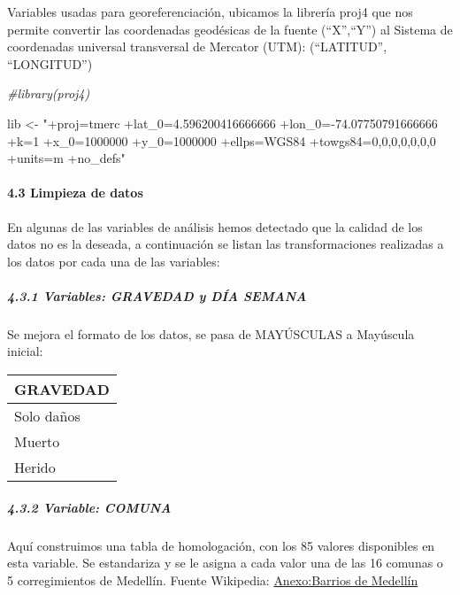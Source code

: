 \documentclass[]{article}
\newenvironment{Shaded}{\begin{snugshade}}{\end{snugshade}}
\newcommand{\CommentTok}[1]{\textcolor[rgb]{0.56,0.35,0.01}{\textit{#1}}}
\newcommand{\NormalTok}[1]{#1}
\newcommand{\StringTok}[1]{\textcolor[rgb]{0.31,0.60,0.02}{#1}}
\let\oldparagraph\paragraph
\renewcommand{\paragraph}[1]{\oldparagraph{#1}\mbox{}}
\let\oldsubparagraph\subparagraph
\renewcommand{\subparagraph}[1]{\oldsubparagraph{#1}\mbox{}}
\begin{document}
Variables usadas para georeferenciación, ubicamos la librería proj4 que
nos permite convertir las coordenadas geodésicas de la fuente
(``X'',``Y'') al Sistema de coordenadas universal transversal de
Mercator (UTM): (``LATITUD'', ``LONGITUD'')

\begin{Shaded}
\begin{Highlighting}[]
\CommentTok{#library(proj4)}

\NormalTok{lib <-}\StringTok{ "+proj=tmerc +lat_0=4.596200416666666 +lon_0=-74.07750791666666 +k=1 +x_0=1000000 +y_0=1000000 +ellps=WGS84 +towgs84=0,0,0,0,0,0,0 +units=m +no_defs"}
\end{Highlighting}
\end{Shaded}

\hypertarget{limpieza-de-datos}{%
\paragraph{4.3 Limpieza de datos}\label{limpieza-de-datos}}

En algunas de las variables de análisis hemos detectado que la calidad
de los datos no es la deseada, a continuación se listan las
transformaciones realizadas a los datos por cada una de las variables:

\hypertarget{variables-gravedad-y-dia-semana}{%
\subparagraph{4.3.1 Variables: GRAVEDAD y DÍA
SEMANA}\label{variables-gravedad-y-dia-semana}}

Se mejora el formato de los datos, se pasa de MAYÚSCULAS a Mayúscula
inicial:

\begingroup\fontsize{12}{14}\selectfont

\begin{tabular}{l}
\hline
GRAVEDAD\\
\hline
Solo daños\\
\hline
Muerto\\
\hline
Herido\\
\hline
\end{tabular}
\endgroup{}

\hypertarget{variable-comuna}{%
\subparagraph{4.3.2 Variable: COMUNA}\label{variable-comuna}}

Aquí construimos una tabla de homologación, con los 85 valores
disponibles en esta variable. Se estandariza y se le asigna a cada valor
una de las 16 comunas o 5 corregimientos de Medellín. Fuente Wikipedia:
\href{https://es.wikipedia.org/wiki/Anexo:Barrios_de_Medell\%C3\%Adn}{Anexo:Barrios
de Medellín}
\end{document}
